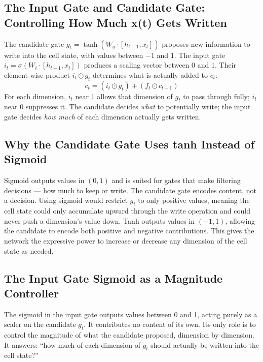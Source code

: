 \subsection{The Input Gate and Candidate Gate: Controlling How Much x(t) Gets Written}
The candidate gate $g_t = \tanh(W_g \cdot [h_{t-1}, x_t])$ proposes new information to write into the cell state, with values between $-1$ and $1$. The input gate $i_t = \sigma(W_i \cdot [h_{t-1}, x_t])$ produces a scaling vector between 0 and 1. Their element-wise product $i_t \odot g_t$ determines what is actually added to $c_t$:
\[
c_t = (i_t \odot g_t) + (f_t \odot c_{t-1})
\]
For each dimension, $i_t$ near 1 allows that dimension of $g_t$ to pass through fully; $i_t$ near 0 suppresses it. The candidate decides \textit{what} to potentially write; the input gate decides \textit{how much} of each dimension actually gets written.

\subsection{Why the Candidate Gate Uses tanh Instead of Sigmoid}
Sigmoid outputs values in $(0, 1)$ and is suited for gates that make filtering decisions --- how much to keep or write. The candidate gate encodes content, not a decision. Using sigmoid would restrict $g_t$ to only positive values, meaning the cell state could only accumulate upward through the write operation and could never push a dimension's value down. Tanh outputs values in $(-1, 1)$, allowing the candidate to encode both positive and negative contributions. This gives the network the expressive power to increase or decrease any dimension of the cell state as needed.

\subsection{The Input Gate Sigmoid as a Magnitude Controller}
The sigmoid in the input gate outputs values between 0 and 1, acting purely as a scaler on the candidate $g_t$. It contributes no content of its own. Its only role is to control the magnitude of what the candidate proposed, dimension by dimension. It answers: ``how much of each dimension of $g_t$ should actually be written into the cell state?''

